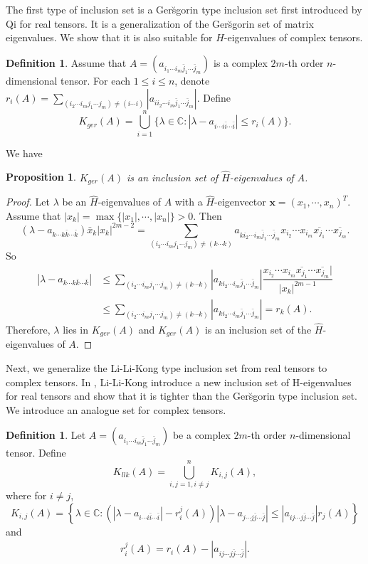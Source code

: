 \documentclass[10pt,reqno]{amsart}
\newtheorem{prop}[thm]{Proposition}
\theoremstyle{definition}
\newtheorem{defn}[thm]{Definition}
\begin{document}
The first type of inclusion set is a Ger\u{s}gorin type inclusion set first introduced by Qi \cite{Q1} for real tensors. It is a generalization of the Ger\u{s}gorin set of matrix eigenvalues. We show that it is also suitable for $\hat{H}$-eigenvalues of complex tensors.
\begin{defn}\label{d4.1} Assume that $A=(a_{i_1\cdots i_{m}\bar{j}_1\cdots \bar{j}_m})$ is a complex $2m$-th order $n$-dimensional tensor. For each $1\leq i\leq n$, denote $r_i(A)=\sum_{(i_2\cdots i_mj_1\cdots j_{m})\neq (i\cdots i)}|a_{ii_2\cdots i_{m}\bar{j}_1\cdots \bar{j}_m}|$. Define $$K_{ger}(A)=\bigcup _{i=1}^n \{\lambda\in \mathbb C: |\lambda-a_{i\cdots i\bar{i}\cdots\bar{i}}|\leq r_i(A)\}.$$
\end{defn}
We have
\begin {prop} \label{4.01}
$K_{ger}(A)$ is an inclusion set of $\hat{H}$-eigenvalues of $A$.
\end{prop}
\begin{proof}
	Let $\lambda$ be an $\hat{H}$-eigenvalues of $A$ with a $\hat{H}$-eigenvector $\mathbf{x}=(x_1,\cdots,x_n)^T$. Assume that $|x_k|=\max\{|x_1|,\cdots,|x_n|\}>0$. Then
	$$(\lambda-a_{k\cdots k\bar{k}\cdots\bar{k}})\bar{x}_k|x_k|^{2m-2}=\sum_{(i_2\cdots i_mj_1\cdots j_{m})\neq (k\cdots k)} a_{ki_2\cdots i_m\bar{j}_1\cdots \bar{j}_m} x_{i_2}\cdots x_{i_m}\overline{x_{j_1}}\cdots\overline{x_{j_m}}.$$
	So 
	\begin{align*}
	|\lambda-a_{k\cdots k\bar{k}\cdots\bar{k}}|&\leq \sum_{(i_2\cdots i_mj_1\cdots j_{m})\neq (k\cdots k)} |a_{ki_2\cdots i_m\bar{j}_1\cdots \bar{j}_m}|\dfrac{x_{i_2}\cdots x_{i_m}\overline{x_{j_1}}\cdots\overline{x_{j_m}}|}{|x_k|^{2m-1}}\\
	&\leq \sum_{(i_2\cdots i_mj_1\cdots j_{m})\neq (k\cdots k)}|a_{ki_2\cdots i_m\bar{j}_1\cdots \bar{j}_m}|=r_k(A).\end{align*}
	Therefore, $\lambda$ lies in $K_{ger}(A)$ and $K_{ger}(A)$ is an inclusion set of the $\hat{H}$-eigenvalues of $A$.
\end{proof}
Next, we generalize the Li-Li-Kong type inclusion set from real tensors to complex tensors.
In \cite{LLK}, Li-Li-Kong introduce a new inclusion set of H-eigenvalues for real tensors and show that it is tighter than the Ger\u{s}gorin type inclusion set. We introduce an analogue set for complex tensors.
\begin{defn}\label{d4.3}
	Let $A=(a_{i_1\cdots i_{m}\bar{j}_1\cdots \bar{j}_m})$ be a complex $2m$-th order $n$-dimensional tensor. Define
	$$K_{llk}(A)=\bigcup_{i,j=1,i\neq j}^nK_{i,j}(A),$$
	where for $i\neq j$, $$K_{i,j}(A)=\left\{\lambda \in \mathbb C :(|\lambda -a_{i\cdots i\bar{i}\cdots\bar{i}}|-r_{i}^{j}(A))|\lambda-a_{j\cdots j\bar{j}\cdots\bar{j}}|\leq|a_{ij\cdots j\bar{j}\cdots\bar{j}}|r_{j}(A) \right\}$$
and \begin{align*}
 r_{i}^{j}(A)=r_{i}(A)-|a_{ij\cdots j\bar{j}\cdots\bar{j}}|.\end{align*}
\end{defn}
\end{document}

